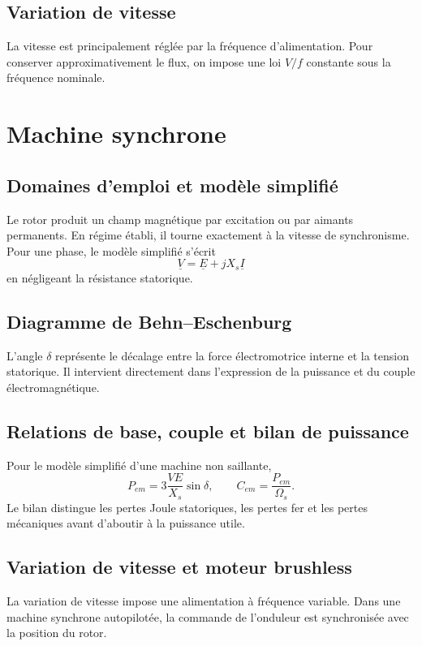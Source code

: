 \subsection{Variation de vitesse}
La vitesse est principalement réglée par la fréquence d'alimentation. Pour conserver approximativement le flux, on impose une loi $V/f$ constante sous la fréquence nominale.
\begin{center}\TLCommandeVsurF\end{center}

\section{Machine synchrone}
\subsection{Domaines d'emploi et modèle simplifié}
Le rotor produit un champ magnétique par excitation ou par aimants permanents. En régime établi, il tourne exactement à la vitesse de synchronisme. Pour une phase, le modèle simplifié s'écrit
\[
\underline V=\underline E+jX_s\underline I
\]
en négligeant la résistance statorique.

\subsection{Diagramme de Behn--Eschenburg}
\begin{center}\TLDiagrammeBehnEschenburg\end{center}
L'angle $\delta$ représente le décalage entre la force électromotrice interne et la tension statorique. Il intervient directement dans l'expression de la puissance et du couple électromagnétique.

\subsection{Relations de base, couple et bilan de puissance}
Pour le modèle simplifié d'une machine non saillante,
\[
P_{em}=3\frac{VE}{X_s}\sin\delta,\qquad C_{em}=\frac{P_{em}}{\Omega_s}.
\]
Le bilan distingue les pertes Joule statoriques, les pertes fer et les pertes mécaniques avant d'aboutir à la puissance utile.

\subsection{Variation de vitesse et moteur brushless}
La variation de vitesse impose une alimentation à fréquence variable. Dans une machine synchrone autopilotée, la commande de l'onduleur est synchronisée avec la position du rotor.
\begin{center}\TLChaineBrushless\end{center}

